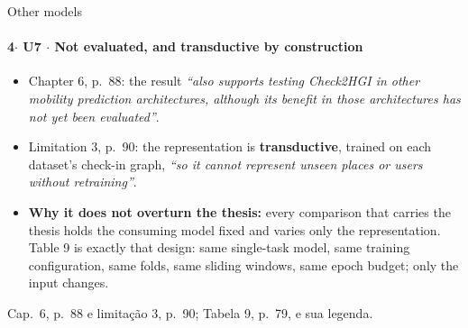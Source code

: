 \documentclass{beamer}
\begin{document}
\begin{frame}[noframenumbering]{Other models}
    \framesubtitle{\normalsize 4$\cdot$ \textbf{U7} $\cdot$ Not evaluated, and transductive by construction}
    \hypertarget{u7}{}
    \small
    \begin{itemize}\setlength{\itemsep}{0pt}\setlength{\parskip}{0pt}
        \item Chapter 6, p.~88: the result \textit{``also supports testing Check2HGI in other mobility prediction architectures, although its benefit in those architectures has not yet been evaluated''}.
        \item Limitation 3, p.~90: the representation is \textbf{transductive}, trained on each dataset's check-in graph, \textit{``so it cannot represent unseen places or users without retraining''}.
        \item \textbf{Why it does not overturn the thesis:} every comparison that carries the thesis holds the consuming model fixed and varies only the representation. Table 9 is exactly that design: same single-task model, same training configuration, same folds, same sliding windows, same epoch budget; only the input changes.
    \end{itemize}
    \vfill
    {\scriptsize
    \begin{minipage}[b]{0.775\linewidth}\raggedright\textcolor{black!70}{Cap.~6, p.~88 e limitação 3, p.~90; Tabela 9, p.~79, e sua legenda.}\end{minipage}\hfill
    \begin{minipage}[b]{0.20\linewidth}\raggedleft \hyperlink{b0}{}\end{minipage}}
\end{frame}
\end{document}
